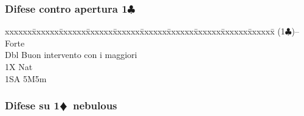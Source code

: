 \documentclass[a4paper,italian]{article}
\newcommand{\BC}{\textcolor{OliveGreen}{$\clubsuit$}}
\newcommand{\BD}{\textcolor{RedOrange}{$\vardiamondsuit$}}
\newcommand{\pdfc}{\texorpdfstring{\BC{}}{C}}
\newcommand{\pdfd}{\texorpdfstring{\BD{}}{D}}
\newenvironment{bidtable}
{\begin{tabbing}

    xxxxxx\=xxxxxx\=xxxxxx\=xxxxxx\=xxxxxx\=xxxxxx\=xxxxxx\=xxxxxx\=xxxxxx\=xxxxxx\=\kill}
{\end{tabbing} }%
\begin{document}
\begin{multicols}{2}
                                        \subsubsection{Difese contro apertura 1\pdfc}
                                        \begin{bidtable}
                                            (1\BC)--\> Forte\\
                                            Dbl \> Buon intervento con i maggiori\\
                                            1X\> Nat\\
                                            1SA\> 5M5m\\
                                        \end{bidtable}
                                        \subsubsection{Difese su 1\pdfd\ nebulous}


\end{multicols}
\end{document}

